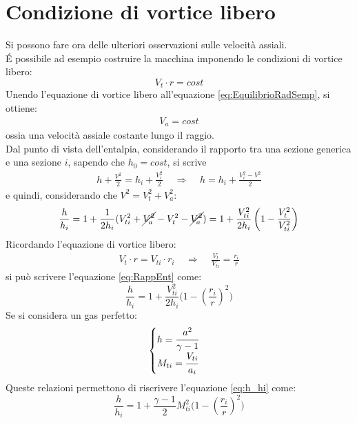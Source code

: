 \section{Condizione di vortice libero}
Si possono fare ora delle ulteriori osservazioni sulle velocità assiali.\\
\'E possibile ad esempio costruire la macchina imponendo le condizioni di vortice libero:
\begin{equation}
\boxed{V_t \cdot r = cost}
\end{equation}
Unendo l'equazione di vortice libero all'equazione \ref{eq:EquilibrioRadSemp}, si ottiene:
\begin{align*}
V_a=cost
\end{align*}
ossia una velocità assiale costante lungo il raggio.\\
Dal punto di vista dell'entalpia, considerando il rapporto tra una sezione generica e una sezione $i$, sapendo che $h_0 = cost$, si scrive
\begin{align*}
h + \frac{V^2}{2} = h_i + \frac{V_i^2}{2} \;\;\;\; \Rightarrow \;\;\;\; h = h_i	+ \frac{V_i^2 - V^2}{2}
\end{align*}
e quindi, considerando che $V^2=V_t^2+V_a^2$:
\begin{equation}
\frac{h}{h_i} = 1 + \frac{1}{2h_i} (V_{ti}^2+ \cancel{V_a^2}-V_t^2 -\cancel{V_a^2}) = 1 + \frac{V_{ti}^2}{2h_i} \left( 1- \frac{V_t^2}{V_{ti}^2} \right)
\label{eq:RappEnt}
\end{equation}
Ricordando l'equazione di vortice libero:
\begin{align*}
V_t \cdot r = V_{ti} \cdot r_i \;\;\;\; \Rightarrow \;\;\;\; \frac{V_t}{V_{ti}} = \frac{r_i}{r}
\end{align*}
si può scrivere l'equazione \ref{eq:RappEnt} come:
\begin{equation}\label{eq:h_hi}
\boxed{\frac{h}{h_i} = 1 + \frac{V_{ti}^2}{2h_i} \bigg(1 -  \left( \frac{r_i}{r}\right)^2 \bigg)}
\end{equation}
Se si considera un gas perfetto:
\begin{equation}\label{eq:condgasperf}
\begin{cases}
h = \cfrac{a ^ 2}{\gamma - 1} \\
M_{ti} = \cfrac{V_{ti}}{a_i}
\end{cases}
\end{equation}
Queste relazioni permettono di riscrivere l'equazione \ref{eq:h_hi} come:
\begin{equation}
\boxed{\frac{h}{h_i} = 1 + \frac{\gamma -1}{2} M_{ti}^2 \bigg(1 -  \left( \frac{r_i}{r}\right)^2 \bigg) }
\end{equation}
